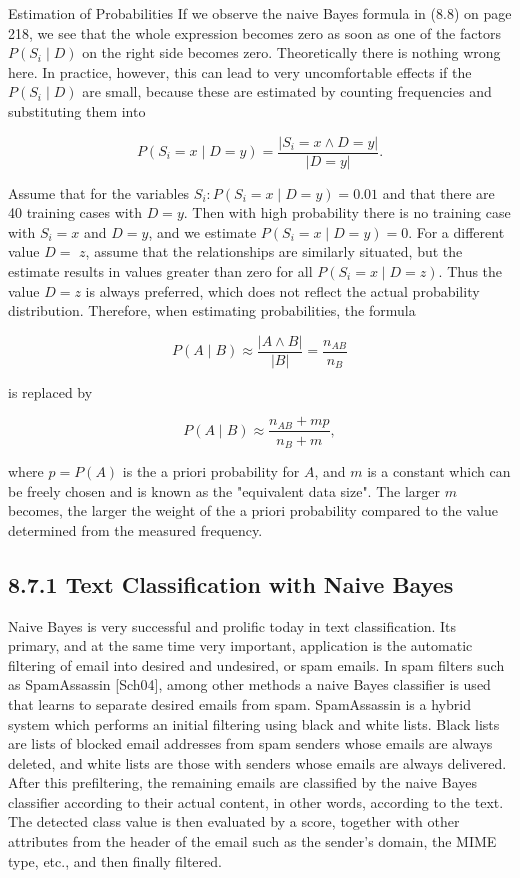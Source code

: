 \documentclass[10pt]{book}
\begin{document}
\begin{center}
\begin{enumerate}
\begin{center}
\begin{center}
\begin{center}
Estimation of Probabilities If we observe the naive Bayes formula in (8.8) on page 218, we see that the whole expression becomes zero as soon as one of the factors $P\left(S_{i} \mid D\right)$ on the right side becomes zero. Theoretically there is nothing wrong here. In practice, however, this can lead to very uncomfortable effects if the $P\left(S_{i} \mid D\right)$ are small, because these are estimated by counting frequencies and substituting them into

$$
P\left(S_{i}=x \mid D=y\right)=\frac{\left|S_{i}=x \wedge D=y\right|}{|D=y|} .
$$

Assume that for the variables $S_{i}: P\left(S_{i}=x \mid D=y\right)=0.01$ and that there are 40 training cases with $D=y$. Then with high probability there is no training case with $S_{i}=x$ and $D=y$, and we estimate $P\left(S_{i}=x \mid D=y\right)=0$. For a different value $D=$ $z$, assume that the relationships are similarly situated, but the estimate results in values greater than zero for all $P\left(S_{i}=x \mid D=z\right)$. Thus the value $D=z$ is always preferred, which does not reflect the actual probability distribution. Therefore, when estimating probabilities, the formula

$$
P(A \mid B) \approx \frac{|A \wedge B|}{|B|}=\frac{n_{A B}}{n_{B}}
$$

is replaced by

$$
P(A \mid B) \approx \frac{n_{A B}+m p}{n_{B}+m},
$$

where $p=P(A)$ is the a priori probability for $A$, and $m$ is a constant which can be freely chosen and is known as the "equivalent data size". The larger $m$ becomes, the larger the weight of the a priori probability compared to the value determined from the measured frequency.

\subsection*{8.7.1 Text Classification with Naive Bayes}
Naive Bayes is very successful and prolific today in text classification. Its primary, and at the same time very important, application is the automatic filtering of email into desired and undesired, or spam emails. In spam filters such as SpamAssassin [Sch04], among other methods a naive Bayes classifier is used that learns to separate desired emails from spam. SpamAssassin is a hybrid system which performs an initial filtering using black and white lists. Black lists are lists of blocked email addresses from spam senders whose emails are always deleted, and white lists are those with senders whose emails are always delivered. After this prefiltering, the remaining emails are classified by the naive Bayes classifier according to their actual content, in other words, according to the text. The detected class value is then evaluated by a score, together with other attributes from the header of the email such as the sender's domain, the MIME type, etc., and then finally filtered.


\end{center}
\end{center}
\end{center}
\end{enumerate}
\end{center}
\end{document}
